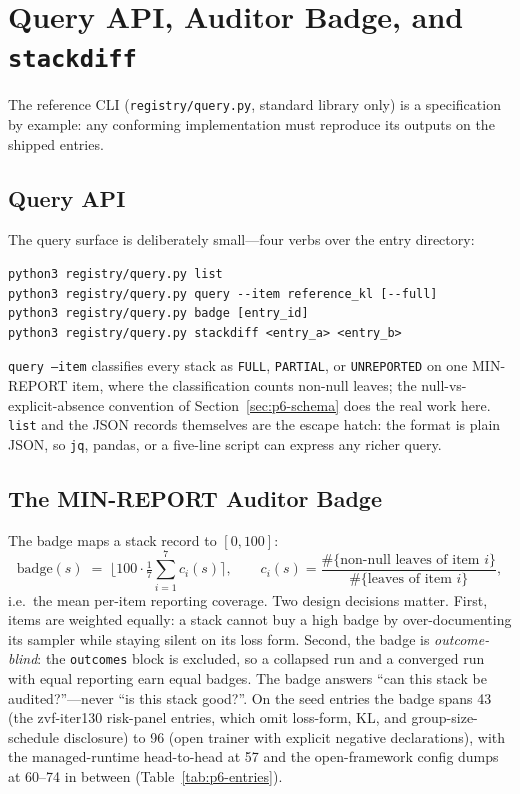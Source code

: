 \section{Query API, Auditor Badge, and \texttt{stackdiff}}
\label{sec:p6-query}

The reference CLI (\texttt{registry/query.py}, standard library only) is a
specification by example: any conforming implementation must reproduce its
outputs on the shipped entries.

\subsection{Query API}
\label{sec:p6-query-api}
The query surface is deliberately small---four verbs over the entry
directory:

\begin{lstlisting}[basicstyle=\ttfamily\scriptsize, frame=single,
  caption={The reference CLI surface.}, label={lst:p6-cli}]
python3 registry/query.py list
python3 registry/query.py query --item reference_kl [--full]
python3 registry/query.py badge [entry_id]
python3 registry/query.py stackdiff <entry_a> <entry_b>
\end{lstlisting}

\texttt{query --item} classifies every stack as \texttt{FULL},
\texttt{PARTIAL}, or \texttt{UNREPORTED} on one MIN-REPORT item, where the
classification counts non-null leaves; the null-vs-explicit-absence convention
of Section~\ref{sec:p6-schema} does the real work here. \texttt{list} and the
JSON records themselves are the escape hatch: the format is plain JSON, so
\texttt{jq}, pandas, or a five-line script can express any richer query.

\subsection{The MIN-REPORT Auditor Badge}
\label{sec:p6-badge}
The badge maps a stack record to $[0,100]$:
\begin{equation}
  \mathrm{badge}(s) \;=\;
  \Big\lfloor 100 \cdot \tfrac{1}{7}\textstyle\sum_{i=1}^{7}
  c_i(s) \Big\rceil,
  \qquad
  c_i(s) = \frac{\#\{\text{non-null leaves of item } i\}}
                {\#\{\text{leaves of item } i\}},
  \label{eq:p6-badge}
\end{equation}
i.e.\ the mean per-item reporting coverage. Two design decisions matter.
First, items are weighted equally: a stack cannot buy a high badge by
over-documenting its sampler while staying silent on its loss form. Second,
the badge is \emph{outcome-blind}: the \texttt{outcomes} block is excluded, so
a collapsed run and a converged run with equal reporting earn equal badges.
The badge answers ``can this stack be audited?''---never ``is this stack
good?''. On the seed entries the badge spans 43 (the zvf-iter130
risk-panel entries, which omit loss-form, KL, and group-size-schedule
disclosure) to 96 (open trainer with explicit negative declarations),
with the managed-runtime head-to-head at 57 and the open-framework
config dumps at 60--74 in between (Table~\ref{tab:p6-entries}).

